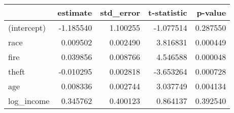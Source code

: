 \begin{tabular}{lrrrr}
\toprule
{} &  estimate &  std\_error &  t-statistic &   p-value \\
\midrule
(intercept) & -1.185540 &   1.100255 &    -1.077514 &  0.287550 \\
race        &  0.009502 &   0.002490 &     3.816831 &  0.000449 \\
fire        &  0.039856 &   0.008766 &     4.546588 &  0.000048 \\
theft       & -0.010295 &   0.002818 &    -3.653264 &  0.000728 \\
age         &  0.008336 &   0.002744 &     3.037749 &  0.004134 \\
log\_income  &  0.345762 &   0.400123 &     0.864137 &  0.392540 \\
\bottomrule
\end{tabular}
